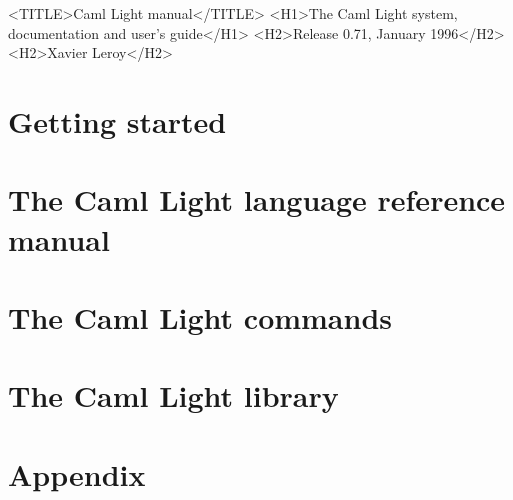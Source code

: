 \begin{rawhtml}
  <TITLE>Caml Light manual</TITLE>
  <H1>The Caml Light system, documentation and user's guide</H1>
  <H2>Release 0.71, January 1996</H2>
  <H2>Xavier Leroy</H2>
\end{rawhtml}



\part{Getting started} \label{p:gettingstarted}


\part{The Caml Light language reference manual} \label{p:refman}



\part{The Caml Light commands} \label{p:commands}










\part{The Caml Light library} \label{p:library}







\part{Appendix} \label{p:appendix}

